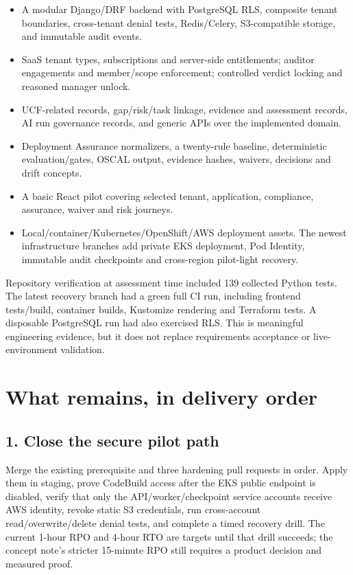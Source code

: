 \documentclass[11pt,a4paper]{article}
\begin{document}
\begin{itemize}
  \item A modular Django/DRF backend with PostgreSQL RLS, composite tenant
  boundaries, cross-tenant denial tests, Redis/Celery, S3-compatible storage, and
  immutable audit events.
  \item SaaS tenant types, subscriptions and server-side entitlements; auditor
  engagements and member/scope enforcement; controlled verdict locking and
  reasoned manager unlock.
  \item UCF-related records, gap/risk/task linkage, evidence and assessment records,
  AI run governance records, and generic APIs over the implemented domain.
  \item Deployment Assurance normalizers, a twenty-rule baseline, deterministic
  evaluation/gates, OSCAL output, evidence hashes, waivers, decisions and drift
  concepts.
  \item A basic React pilot covering selected tenant, application, compliance,
  assurance, waiver and risk journeys.
  \item Local/container/Kubernetes/OpenShift/AWS deployment assets. The newest
  infrastructure branches add private EKS deployment, Pod Identity, immutable
  audit checkpoints and cross-region pilot-light recovery.
\end{itemize}

Repository verification at assessment time included 139 collected Python tests.
The latest recovery branch had a green full CI run, including frontend tests/build,
container builds, Kustomize rendering and Terraform tests. A disposable PostgreSQL
run had also exercised RLS. This is meaningful engineering evidence, but it does
not replace requirements acceptance or live-environment validation.

\section{What remains, in delivery order}

\subsection{1. Close the secure pilot path}

Merge the existing prerequisite and three hardening pull requests in order. Apply
them in staging, prove CodeBuild access after the EKS public endpoint is disabled,
verify that only the API/worker/checkpoint service accounts receive AWS identity,
revoke static S3 credentials, run cross-account read/overwrite/delete denial tests,
and complete a timed recovery drill. The current 1-hour RPO and 4-hour RTO are
targets until that drill succeeds; the concept note's stricter 15-minute RPO still
requires a product decision and measured proof.
\end{document}
